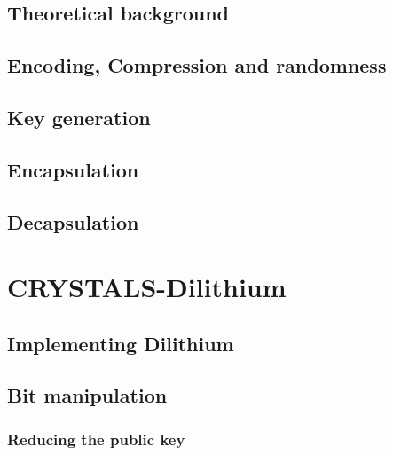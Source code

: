 \section{Theoretical background}
\label{sec:kyber_theroteical}


\section{Encoding, Compression and randomness}
\label{sec:kyber_enc_compr}


\section{Key generation}
\label{sec:kyber_keygen}


\section{Encapsulation}
\label{sec:kyber_enc}


\section{Decapsulation}
\label{sec:kyber_dec}


\chapter{CRYSTALS-Dilithium}
\label{ch:dilithium}


\section{Implementing Dilithium}
\label{sec:implementing_dil}


\section{Bit manipulation}
\label{sec:dil_bit_man}


\subsection{Reducing the public key}
\label{subsec:dil_reducing_pub_key}



